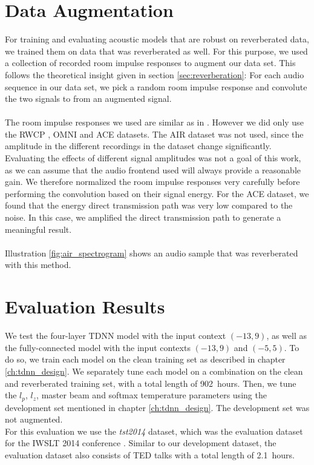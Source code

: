 \section{Data Augmentation}
For training and evaluating acoustic models that are robust on reverberated data, we trained them on data that was reverberated as well. For this purpose, we used a collection of recorded room impulse responses to augment our data set. This follows the theoretical insight given in section \ref{sec:reverberation}: For each audio sequence in our data set, we pick a random room impulse response and convolute the two signals to from an augmented signal. \\ \\
The room impulse responses we used are similar as in \cite{ritter2016training}. However we did only use the RWCP \cite{nakamura2000acoustical}, OMNI \cite{stewart2010database} and ACE \cite{eaton2015ace} datasets. The AIR dataset  \cite{jeub2009binaural} was not used, since the amplitude in the different recordings in the dataset change significantly.
Evaluating the effects of different signal amplitudes was not a goal of this work, as we can assume that the audio frontend used will always provide a reasonable gain. We therefore normalized the room impulse responses very carefully before performing the convolution based on their signal energy. For the ACE dataset, we found that the energy direct transmission path was very low compared to the noise. In this case, we amplified the direct transmission path to generate a meaningful result. \\ \\
Illustration \ref{fig:air_spectrogram} shows an audio sample that was reverberated with this method. 
\section{Evaluation Results}
We test the four-layer TDNN model with the input context $(-13, 9)$, as well as the fully-connected model with the input contexts $(-13, 9)$ and $(-5, 5)$. To do so, we train each model on the clean training set as described in chapter \ref{ch:tdnn_design}. We separately tune each model on a combination on the clean and reverberated training set, with a total length of 902~hours. Then, we tune the $l_p$, $l_z$, master beam and softmax temperature parameters using the development set mentioned in chapter \ref{ch:tdnn_design}. The development set was not augmented. \\ 
For this evaluation we use the \textit{tst2014} dataset, which was the evaluation dataset for the IWSLT 2014 conference \cite{cettolo2014report}. Similar to our development dataset, the evaluation dataset also consists of TED talks with a total length of 2.1~hours. 

